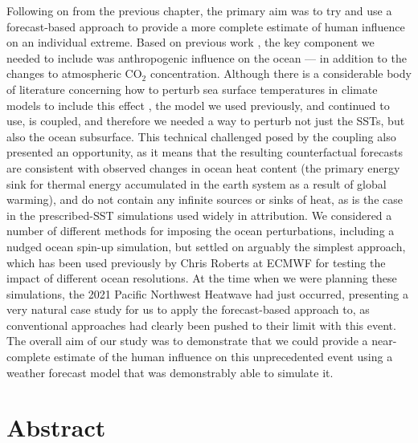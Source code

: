   Following on from the previous chapter, the primary aim was to try and use a forecast-based approach to provide a more complete estimate of human influence on an individual extreme. Based on previous work \citep{pall_anthropogenic_2011}, the key component we needed to include was anthropogenic influence on the ocean --- in addition to the changes to atmospheric CO$_2$ concentration. Although there is a considerable body of literature concerning how to perturb sea surface temperatures in climate models to include this effect \citep{stone_benchmark_2021}, the model we used previously, and continued to use, is coupled, and therefore we needed a way to perturb not just the SSTs, but also the ocean subsurface. This technical challenged posed by the coupling also presented an opportunity, as it means that the resulting counterfactual forecasts are consistent with observed changes in ocean heat content (the primary energy sink for thermal energy accumulated in the earth system as a result of global warming), and do not contain any infinite sources or sinks of heat, as is the case in the prescribed-SST simulations used widely in attribution. We considered a number of different methods for imposing the ocean perturbations, including a nudged ocean spin-up simulation, but settled on arguably the simplest approach, which has been used previously by Chris Roberts at ECMWF for testing the impact of different ocean resolutions. At the time when we were planning these simulations, the 2021 Pacific Northwest Heatwave had just occurred, presenting a very natural case study for us to apply the forecast-based approach to, as conventional approaches had clearly been pushed to their limit with this event. The overall aim of our study was to demonstrate that we could provide a near-complete estimate of the human influence on this unprecedented event using a weather forecast model that was demonstrably able to simulate it.

\section{Abstract}\label{ch4:abstract}

